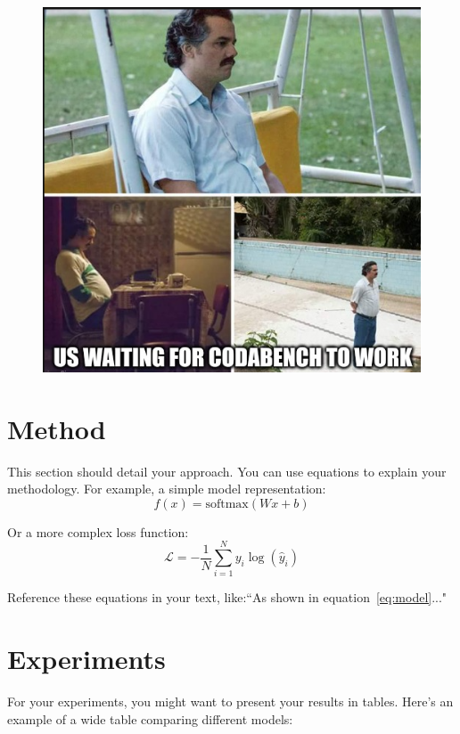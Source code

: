 \documentclass[11pt]{article}
\begin{document}
\begin{multicols*}{2}
        \begin{figure}[H]
            \centering
            \includegraphics[width=0.5\linewidth]{Screenshot from 2024-11-21 11-03-01.png}
        \end{figure}

        \section{Method}
        This section should detail your approach. You can use equations to explain your methodology. For example, a simple model representation:
        \begin{equation}
            \label{eq:model}
            f(x) = \text{softmax}(Wx + b)
        \end{equation}

        \noindent Or a more complex loss function:
        \begin{equation}
            \label{eq:loss}
            \mathcal{L} = -\frac{1}{N}\sum_{i=1}^{N} y_i\log(\hat{y}_i)
        \end{equation}

        \noindent Reference these equations in your text, like:``As shown in equation~\ref{eq:model}..."

        \section{Experiments}
        For your experiments, you might want to present your results in tables. Here's an example of a wide table comparing different models:


\end{multicols*}
\end{document}

